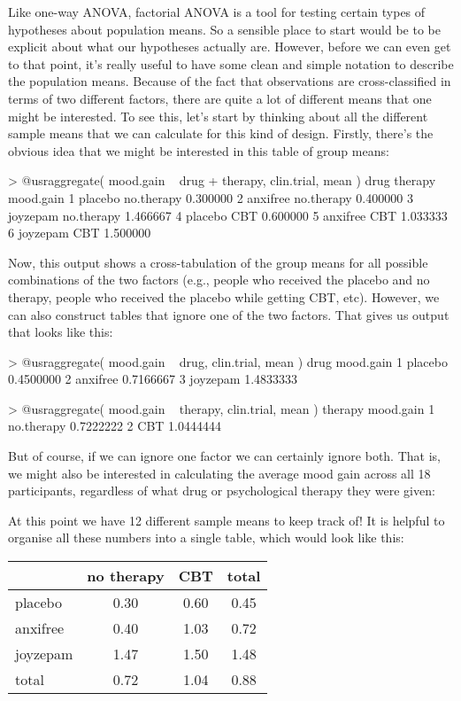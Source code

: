 Like one-way ANOVA, factorial ANOVA is a tool for testing certain types of hypotheses about population means. So a sensible place to start would be to be explicit about what our hypotheses actually are. However, before we can even get to that point, it's really useful to have some clean and simple notation to describe the population means. Because of the fact that observations are cross-classified in terms of two different factors, there are quite a lot of different means that one might be interested. To see this, let's start by thinking about all the different sample means that we can calculate for this kind of design. Firstly, there's the obvious idea that we might be interested in this table of group means:
\begin{rblock1}
> @usr{aggregate( mood.gain ~ drug + therapy, clin.trial, mean )}
      drug    therapy mood.gain
1  placebo no.therapy  0.300000
2 anxifree no.therapy  0.400000
3 joyzepam no.therapy  1.466667
4  placebo        CBT  0.600000
5 anxifree        CBT  1.033333
6 joyzepam        CBT  1.500000
\end{rblock1}
Now, this output shows a cross-tabulation of the group means for all possible combinations of the two factors (e.g., people who received the placebo and no therapy, people who received the placebo while getting CBT, etc). However, we can also construct tables that ignore one of the two factors. That gives us output that looks like this:
\begin{rblock1}
> @usr{aggregate( mood.gain ~ drug, clin.trial, mean )}
      drug mood.gain
1  placebo 0.4500000
2 anxifree 0.7166667
3 joyzepam 1.4833333

> @usr{aggregate( mood.gain ~ therapy, clin.trial, mean )}
     therapy mood.gain
1 no.therapy 0.7222222
2        CBT 1.0444444
\end{rblock1}
But of course, if we can ignore one factor we can certainly ignore both. That is, we might also be interested in calculating the average  mood gain across all 18 participants, regardless of what drug or psychological therapy they were given:
At this point we have 12 different sample means to keep track of! It is helpful to organise all these numbers into a single table, which would look like this:
\begin{center}
\begin{tabular}{l|cc|c}
& no therapy & CBT & total \\ \hline
placebo & 0.30 & 0.60 & 0.45 \\
anxifree & 0.40 & 1.03 & 0.72 \\
joyzepam & 1.47 & 1.50 & 1.48 \\ \hline
total & 0.72 & 1.04 & 0.88
\end{tabular}
\end{center}
